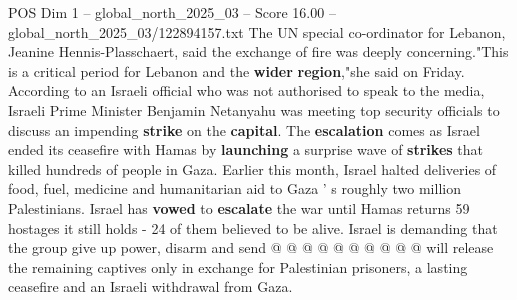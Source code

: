 \begin{textsample}{POS Dim 1 – global\_north\_2025\_03 – Score 16.00 – global\_north\_2025\_03/122894157.txt}
The UN special co-ordinator for Lebanon, Jeanine Hennis-Plasschaert, said the exchange of fire was deeply concerning."This is a critical period for Lebanon and the \textbf{wider} \textbf{region},"she said on Friday.
According to an Israeli official who was not authorised to speak to the media, Israeli Prime Minister Benjamin Netanyahu was meeting top security officials to discuss an impending \textbf{strike} on the \textbf{capital}.
The \textbf{escalation} comes as Israel ended its ceasefire with Hamas by \textbf{launching} a surprise wave of \textbf{strikes} that killed hundreds of people in Gaza.
Earlier this month, Israel halted deliveries of food, fuel, medicine and humanitarian aid to Gaza ' s roughly two million Palestinians.
Israel has \textbf{vowed} to \textbf{escalate} the war until Hamas returns 59 hostages it still holds - 24 of them believed to be alive.
Israel is demanding that the group give up power, disarm and send @ @ @ @ @ @ @ @ @ @ will release the remaining captives only in exchange for Palestinian prisoners, a lasting ceasefire and an Israeli withdrawal from Gaza.

\end{textsample}
